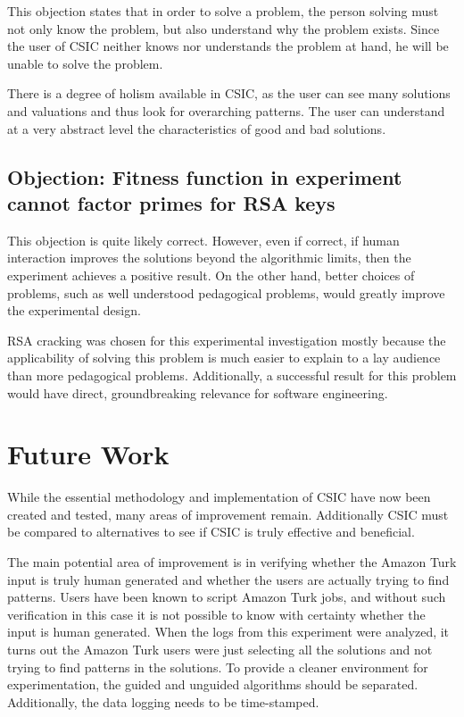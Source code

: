 This objection states that in order to solve a problem, the person solving must not only know the problem, but also understand why the problem exists. Since the user of CSIC neither knows nor understands the problem at hand, he will be unable to solve the problem.

There is a degree of holism available in CSIC, as the user can see many solutions and valuations and thus look for overarching patterns. The user can understand at a very abstract level the characteristics of good and bad solutions.

\subsection{Objection: Fitness function in experiment cannot factor primes for RSA keys} 

This objection is quite likely correct.  However, even if correct, if human interaction improves the solutions beyond the algorithmic limits, then the experiment achieves a positive result.  On the other hand, better choices of problems, such as well understood pedagogical problems, would greatly improve the experimental design.  

RSA cracking was chosen for this experimental investigation mostly because the applicability of solving this problem is much easier to explain to a lay audience than more pedagogical problems.  Additionally, a successful result for this problem would have direct, groundbreaking relevance for software engineering.

\section{Future Work}\label{sec:future-work}

While the essential methodology and implementation of CSIC have now been created and tested, many areas of improvement remain.  Additionally CSIC must be compared to alternatives to see if CSIC is truly effective and beneficial.

The main potential area of improvement is in verifying whether the Amazon Turk input is truly human generated and whether the users are actually trying to find patterns.  Users have been known to script Amazon Turk jobs, and without such verification in this case it is not possible to know with certainty whether the input is human generated.  When the logs from this experiment were analyzed, it turns out the Amazon Turk users were just selecting all the solutions and not trying to find patterns in the solutions.  To provide a cleaner environment for experimentation, the guided and unguided algorithms should be separated.  Additionally, the data logging needs to be time-stamped.


